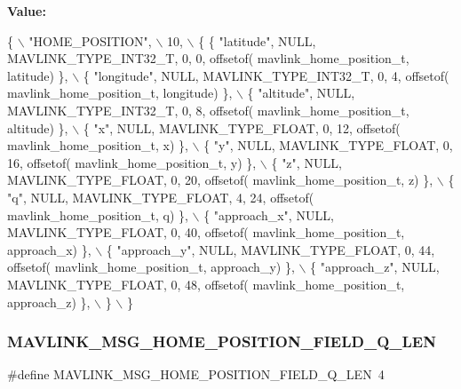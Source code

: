 {\bfseries Value\+:}
\begin{DoxyCode}
\{ \(\backslash\)
    \textcolor{stringliteral}{"HOME\_POSITION"}, \(\backslash\)
    10, \(\backslash\)
    \{  \{ \textcolor{stringliteral}{"latitude"}, NULL, MAVLINK_TYPE_INT32_T, 0, 0, offsetof(
      mavlink_home_position_t, latitude) \}, \(\backslash\)
         \{ \textcolor{stringliteral}{"longitude"}, NULL, MAVLINK_TYPE_INT32_T, 0, 4, offsetof(
      mavlink_home_position_t, longitude) \}, \(\backslash\)
         \{ \textcolor{stringliteral}{"altitude"}, NULL, MAVLINK_TYPE_INT32_T, 0, 8, offsetof(
      mavlink_home_position_t, altitude) \}, \(\backslash\)
         \{ \textcolor{stringliteral}{"x"}, NULL, MAVLINK_TYPE_FLOAT, 0, 12, offsetof(
      mavlink_home_position_t, x) \}, \(\backslash\)
         \{ \textcolor{stringliteral}{"y"}, NULL, MAVLINK_TYPE_FLOAT, 0, 16, offsetof(
      mavlink_home_position_t, y) \}, \(\backslash\)
         \{ \textcolor{stringliteral}{"z"}, NULL, MAVLINK_TYPE_FLOAT, 0, 20, offsetof(
      mavlink_home_position_t, z) \}, \(\backslash\)
         \{ \textcolor{stringliteral}{"q"}, NULL, MAVLINK_TYPE_FLOAT, 4, 24, offsetof(
      mavlink_home_position_t, q) \}, \(\backslash\)
         \{ \textcolor{stringliteral}{"approach\_x"}, NULL, MAVLINK_TYPE_FLOAT, 0, 40, offsetof(
      mavlink_home_position_t, approach\_x) \}, \(\backslash\)
         \{ \textcolor{stringliteral}{"approach\_y"}, NULL, MAVLINK_TYPE_FLOAT, 0, 44, offsetof(
      mavlink_home_position_t, approach\_y) \}, \(\backslash\)
         \{ \textcolor{stringliteral}{"approach\_z"}, NULL, MAVLINK_TYPE_FLOAT, 0, 48, offsetof(
      mavlink_home_position_t, approach\_z) \}, \(\backslash\)
         \} \(\backslash\)
\}
\end{DoxyCode}
\mbox{\label{mavlink__msg__home__position_8h_a0b5d32f7d8783fc6ac0d21253de94281}} 
\subsubsection{M\+A\+V\+L\+I\+N\+K\+\_\+\+M\+S\+G\+\_\+\+H\+O\+M\+E\+\_\+\+P\+O\+S\+I\+T\+I\+O\+N\+\_\+\+F\+I\+E\+L\+D\+\_\+\+Q\+\_\+\+L\+EN}
{\footnotesize\ttfamily \#define M\+A\+V\+L\+I\+N\+K\+\_\+\+M\+S\+G\+\_\+\+H\+O\+M\+E\+\_\+\+P\+O\+S\+I\+T\+I\+O\+N\+\_\+\+F\+I\+E\+L\+D\+\_\+\+Q\+\_\+\+L\+EN~4}

